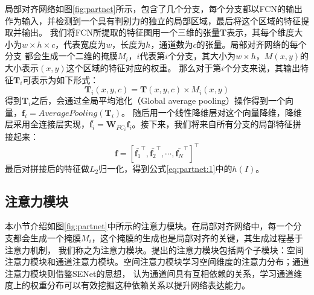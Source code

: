 局部对齐网络如图\ref{fig:partnet}所示，包含了几个分支，每个分支都以FCN的输出作为输入，并检测到一个具有判别力的独立的局部区域，最后将这个区域的特征提取并输出。
我们将FCN所提取的特征图用一个三维的张量\textbf{T}表示，其每个维度大小为$w\times h \times c$，代表宽度为$w$，长度为$h$，通道数为$c$的张量。局部对齐网络的每个分支
都会生成一个二维的掩膜$M_{i}$，$i$代表第$i$个分支，其大小为$w\times h$，$M(x,y)$的大小表示$(x,y)$这个区域的特征对应的权重。
那么对于第$i$个分支来说，其输出特征$\textbf{T}_{i}$可表示为如下形式：
\begin{equation}
\label{eq:partnet:3}
\textbf{T}_{i}(x,y,c)=\textbf{T}(x,y,c) \times M_{i}(x,y)
\end{equation}
得到$\textbf{T}_{i}$之后，会通过全局平均池化（Global average pooling）操作得到一个向量，$\textbf{f}_{i}=AveragePooling(\textbf{T}_{i})$。
随后用一个线性降维层对这个向量降维，降维层采用全连接层实现，$\bar{\textbf{f}_{i}}=\textbf{W}_{FC_{i}}\textbf{f}_{i}$。接下来，我们将来自所有分支的局部特征拼接起来：
\begin{equation}
\label{eq:partnet:4}
\textbf{f}=[\bar{\textbf{f}_{1}}^\top,\bar{\textbf{f}_{2}}^\top,\cdots,\bar{\textbf{f}_{N}}^\top]^\top
\end{equation}
最后对拼接后的特征做$L_{2}$归一化，得到公式\ref{eq:partnet:1}中的$h(I)$。

\subsection{注意力模块}
本小节介绍如图\ref{fig:partnet}中所示的注意力模块。在局部对齐网络中，每一个分支都会生成一个掩膜$M_{i}$，这个掩膜的生成也是局部对齐的关键，其生成过程基于注意力机制，
我们称之为注意力模块。提出的注意力模块包括两个子模块：空间注意力模块和通道注意力模块。空间注意力模块学习空间维度的注意力分布；通道注意力模块则借鉴SENet的思想，
认为通道间具有互相依赖的关系，学习通道维度上的权重分布可以有效挖掘这种依赖关系以提升网络表达能力。

